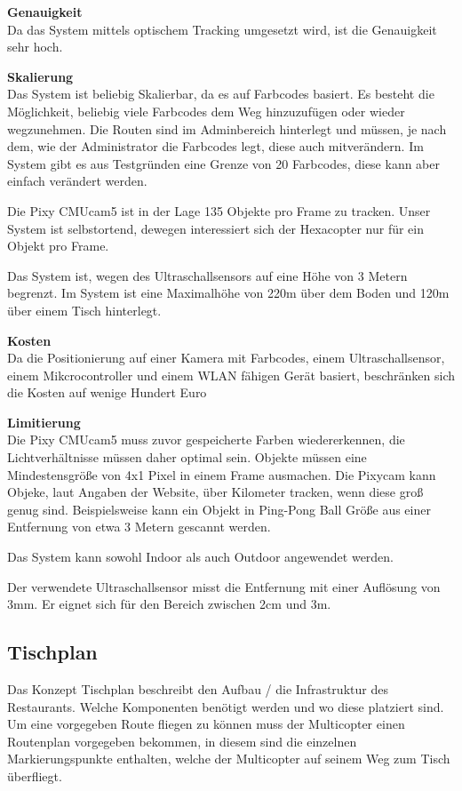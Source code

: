   \textbf{Genauigkeit}\\
  Da das System mittels optischem Tracking umgesetzt wird, ist die Genauigkeit sehr hoch.
  
  \textbf{Skalierung}\\
  Das System ist beliebig Skalierbar, da es auf Farbcodes basiert. Es besteht die Möglichkeit, beliebig viele Farbcodes dem Weg hinzuzufügen oder wieder wegzunehmen. Die Routen sind im Adminbereich hinterlegt und müssen, je nach dem, wie der Administrator die Farbcodes legt, diese auch mitverändern. Im System gibt es aus Testgründen eine Grenze von 20 Farbcodes, diese kann aber einfach verändert werden.

  Die Pixy CMUcam5 ist in der Lage 135 Objekte pro Frame zu tracken. Unser System ist selbstortend, dewegen interessiert sich der Hexacopter nur für ein Objekt pro Frame. \cite{PIXY_Porting_Examplecode}

  Das System ist, wegen des Ultraschallsensors auf eine Höhe von 3 Metern begrenzt. Im System ist eine Maximalhöhe von 220m über dem Boden und 120m über einem Tisch hinterlegt.

  \textbf{Kosten}\\
  Da  die Positionierung auf einer Kamera mit Farbcodes, einem Ultraschallsensor, einem Mikcrocontroller und einem WLAN fähigen Gerät basiert, beschränken sich die Kosten auf wenige Hundert Euro

  \textbf{Limitierung}\\
  Die Pixy CMUcam5 muss zuvor gespeicherte Farben wiedererkennen, die Lichtverhältnisse müssen daher optimal sein.  
  Objekte müssen eine Mindestensgröße von 4x1 Pixel in einem Frame ausmachen. Die Pixycam kann Objeke, laut Angaben der Website, über Kilometer tracken, wenn diese groß genug sind. Beispielsweise kann ein Objekt in Ping-Pong Ball Größe aus einer Entfernung von etwa 3 Metern gescannt werden. 
  \cite{Pixy}

  Das System kann sowohl Indoor als auch Outdoor angewendet werden.

  Der verwendete Ultraschallsensor misst die Entfernung mit einer Auflösung von 3mm. Er eignet sich für den Bereich zwischen 2cm und 3m. 
  \cite{Ultrasonic}

  \subsection{Tischplan}

  Das Konzept Tischplan beschreibt den Aufbau / die Infrastruktur des Restaurants. Welche Komponenten benötigt werden und wo diese platziert sind.
  Um eine vorgegeben Route fliegen zu können muss der Multicopter einen Routenplan vorgegeben bekommen, in diesem sind die einzelnen Markierungspunkte enthalten, welche der Multicopter auf seinem Weg zum Tisch überfliegt.

